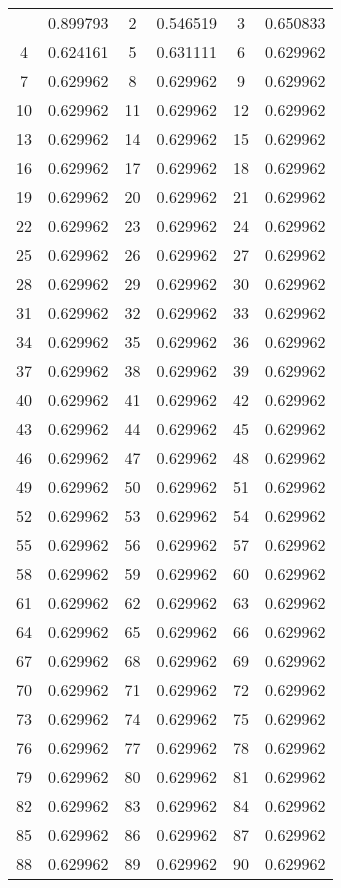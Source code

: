 \documentclass[12pt]{article}
\begin{document}
\begin{longtable}{@{}cc|cc|cc@{}}
\bottomrule
\endlastfoot
1 & 0.899793 & 2 & 0.546519 & 3 & 0.650833 \\
4 & 0.624161 & 5 & 0.631111 & 6 & 0.629962 \\
7 & 0.629962 & 8 & 0.629962 & 9 & 0.629962 \\
10 & 0.629962 & 11 & 0.629962 & 12 & 0.629962 \\
13 & 0.629962 & 14 & 0.629962 & 15 & 0.629962 \\
16 & 0.629962 & 17 & 0.629962 & 18 & 0.629962 \\
19 & 0.629962 & 20 & 0.629962 & 21 & 0.629962 \\
22 & 0.629962 & 23 & 0.629962 & 24 & 0.629962 \\
25 & 0.629962 & 26 & 0.629962 & 27 & 0.629962 \\
28 & 0.629962 & 29 & 0.629962 & 30 & 0.629962 \\
31 & 0.629962 & 32 & 0.629962 & 33 & 0.629962 \\
34 & 0.629962 & 35 & 0.629962 & 36 & 0.629962 \\
37 & 0.629962 & 38 & 0.629962 & 39 & 0.629962 \\
40 & 0.629962 & 41 & 0.629962 & 42 & 0.629962 \\
43 & 0.629962 & 44 & 0.629962 & 45 & 0.629962 \\
46 & 0.629962 & 47 & 0.629962 & 48 & 0.629962 \\
49 & 0.629962 & 50 & 0.629962 & 51 & 0.629962 \\
52 & 0.629962 & 53 & 0.629962 & 54 & 0.629962 \\
55 & 0.629962 & 56 & 0.629962 & 57 & 0.629962 \\
58 & 0.629962 & 59 & 0.629962 & 60 & 0.629962 \\
61 & 0.629962 & 62 & 0.629962 & 63 & 0.629962 \\
64 & 0.629962 & 65 & 0.629962 & 66 & 0.629962 \\
67 & 0.629962 & 68 & 0.629962 & 69 & 0.629962 \\
70 & 0.629962 & 71 & 0.629962 & 72 & 0.629962 \\
73 & 0.629962 & 74 & 0.629962 & 75 & 0.629962 \\
76 & 0.629962 & 77 & 0.629962 & 78 & 0.629962 \\
79 & 0.629962 & 80 & 0.629962 & 81 & 0.629962 \\
82 & 0.629962 & 83 & 0.629962 & 84 & 0.629962 \\
85 & 0.629962 & 86 & 0.629962 & 87 & 0.629962 \\
88 & 0.629962 & 89 & 0.629962 & 90 & 0.629962 \\

\end{longtable}
\end{document}
